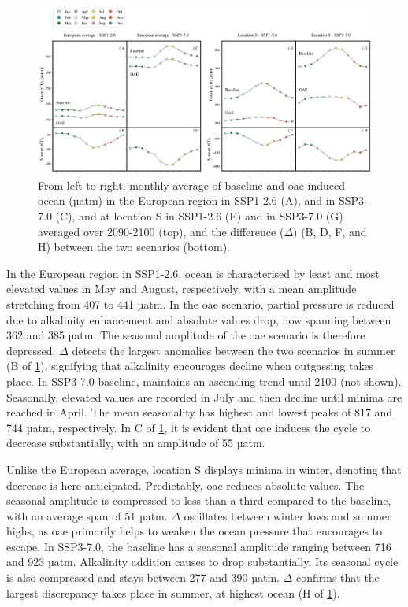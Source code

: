 \begin{figure}[H]
\caption[Monthly average of baseline and \texorpdfstring{OAE}{OAE}-induced ocean ]{From left to right, monthly average of baseline and \ac{oae}-induced ocean  (µatm) in the European region in SSP1-2.6 (A), and in SSP3-7.0 (C), and at location S in SSP1-2.6 (E) and in SSP3-7.0 (G) averaged over 2090-2100 (top), and the difference ($\Delta$) (B, D, F, and H) between the two scenarios (bottom).}
\label{fco2}
\centering
\includegraphics[width=15cm]{fig/3_Results/pCO2/fco2.png}

\end{figure}

In the European region in SSP1-2.6, ocean  is characterised by least and most elevated values in May and August, respectively, with a mean amplitude stretching from 407 to 441 µatm. In the \ac{oae} scenario,  partial pressure is reduced due to alkalinity enhancement and  absolute values drop, now spanning between 362 and 385 µatm. The seasonal amplitude of the \ac{oae} scenario is therefore depressed. $\Delta$  detects the largest anomalies between the two scenarios in summer (B of \cref{fco2}), signifying that alkalinity encourages  decline when  outgassing takes place. In SSP3-7.0 baseline,  maintains an ascending trend until 2100 (not shown). Seasonally, elevated values are recorded in July and then decline until minima are reached in April. The mean seasonality has highest and lowest peaks of 817 and 744 µatm, respectively. In C of \cref{fco2}, it is evident that \ac{oae} induces the cycle to decrease substantially, with an amplitude of 55 µatm. 

Unlike the European average, location S displays minima in winter, denoting that  decrease is here anticipated. Predictably, \ac{oae} reduces  absolute values. The seasonal amplitude is compressed to less than a third compared to the baseline, with an average span of 51 µatm. $\Delta$  oscillates between winter lows and summer highs, as \ac{oae} primarily helps to weaken the ocean pressure that encourages  to escape. In SSP3-7.0, the baseline has a seasonal amplitude ranging between 716 and 923 µatm. Alkalinity addition causes  to drop substantially. Its seasonal cycle is also compressed and stays between 277 and 390 µatm. $\Delta$  confirms that the largest discrepancy takes place in summer, at highest ocean  (H of \cref{fco2}). 

